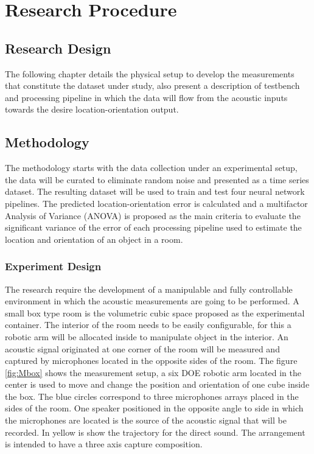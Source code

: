 \chapter{Research Procedure}
\label{chapter:research-proposal}

\section{Research Design}

The following chapter details the physical setup to develop the measurements that constitute the dataset under study, also present a description of testbench and processing pipeline in which the data will flow from the acoustic inputs towards the desire location-orientation output.       

\section{Methodology}

The methodology starts with the data collection under an experimental setup, the data will be curated to eliminate random noise and presented as a time series dataset. The resulting dataset will be used to train and test four neural network pipelines. The predicted location-orientation error is calculated and a multifactor Analysis of Variance (ANOVA) is proposed as the main criteria to evaluate the significant variance of the error of each processing pipeline used to estimate the location and orientation of an object in a room. 
 
\subsection{Experiment Design}
\label{section:experiment-design}
The research require the development of a manipulable and fully controllable environment in which the acoustic measurements are going to be performed. A small box type room is the volumetric cubic space proposed as the experimental container. The interior of the room needs to be easily configurable, for this a robotic arm will be allocated inside to manipulate object in the interior. An acoustic signal originated at one corner of the room will be measured and captured by microphones located in the opposite sides of the room. The figure \ref{fig:Mbox} shows the measurement setup, a six DOE robotic arm located in the center is used to move and change the position and orientation of one cube inside the box. The blue circles correspond to three microphones arrays placed in the sides of the room. One speaker positioned in the opposite angle to side in which the microphones are located is the source of the acoustic signal that will be recorded. In yellow is show the trajectory for the direct sound. The arrangement is intended to have a three axis capture composition. 

